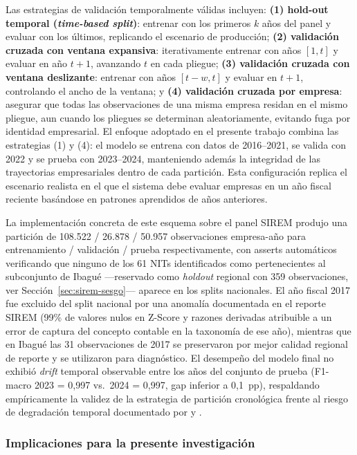 \documentclass[12pt, letterpaper]{article}
\begin{document}
Las estrategias de validaci\'on temporalmente v\'alidas incluyen: \textbf{(1) hold-out temporal (\textit{time-based split})}: entrenar con los primeros $k$ a\~nos del panel y evaluar con los \'ultimos, replicando el escenario de producci\'on; \textbf{(2) validaci\'on cruzada con ventana expansiva}: iterativamente entrenar con a\~nos $[1, t]$ y evaluar en a\~no $t+1$, avanzando $t$ en cada pliegue; \textbf{(3) validaci\'on cruzada con ventana deslizante}: entrenar con a\~nos $[t-w, t]$ y evaluar en $t+1$, controlando el ancho de la ventana; y \textbf{(4) validaci\'on cruzada por empresa}: asegurar que todas las observaciones de una misma empresa residan en el mismo pliegue, aun cuando los pliegues se determinan aleatoriamente, evitando fuga por identidad empresarial. El enfoque adoptado en el presente trabajo combina las estrategias (1) y (4): el modelo se entrena con datos de 2016--2021, se valida con 2022 y se prueba con 2023--2024, manteniendo adem\'as la integridad de las trayectorias empresariales dentro de cada partici\'on. Esta configuraci\'on replica el escenario realista en el que el sistema debe evaluar empresas en un a\~no fiscal reciente bas\'andose en patrones aprendidos de a\~nos anteriores.

La implementaci\'on concreta de este esquema sobre el panel SIREM produjo una partici\'on de 108.522 / 26.878 / 50.957 observaciones empresa-a\~no para entrenamiento / validaci\'on / prueba respectivamente, con asserts autom\'aticos verificando que ninguno de los 61 NITs identificados como pertenecientes al subconjunto de Ibagu\'e ---reservado como \textit{holdout} regional con 359 observaciones, ver Secci\'on~\ref{sec:sirem-sesgo}--- aparece en los splits nacionales. El a\~no fiscal 2017 fue excluido del split nacional por una anomal\'ia documentada en el reporte SIREM (99\% de valores nulos en Z-Score y razones derivadas atribuible a un error de captura del concepto contable en la taxonom\'ia de ese a\~no), mientras que en Ibagu\'e las 31 observaciones de 2017 se preservaron por mejor calidad regional de reporte y se utilizaron para diagn\'ostico. El desempe\~no del modelo final no exhibi\'o \textit{drift} temporal observable entre los a\~nos del conjunto de prueba (F1-macro 2023 = 0,997 vs.\ 2024 = 0,997, gap inferior a 0,1~pp), respaldando emp\'iricamente la validez de la estrategia de partici\'on cronol\'ogica frente al riesgo de degradaci\'on temporal documentado por \citet{Grice2003} y \citet{Bouwmeester2020}.

\subsubsection{Implicaciones para la presente investigaci\'on}
\end{document}
